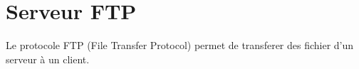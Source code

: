 \section{Serveur FTP}
Le protocole FTP (File Transfer Protocol) permet de transferer des fichier d'un serveur à un client.


